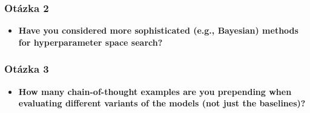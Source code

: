 \begin{frame}
\frametitle{Otázka 2}

\begin{itemize}
    \item \textbf{Have you considered more sophisticated (e.g., Bayesian) methods for hyperparameter space search?}
\end{itemize}



\end{frame}

\begin{frame}
\frametitle{Otázka 3}

\begin{itemize}
    \item \textbf{How many chain-of-thought examples are you prepending when evaluating different variants of the models (not just the baselines)?}
\end{itemize}



\end{frame}
